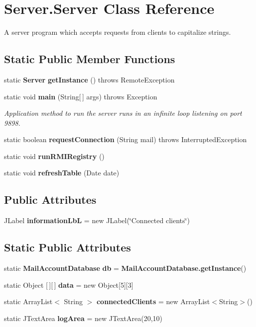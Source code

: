 \section{Server.\+Server Class Reference}
\label{class_server_1_1_server}


A server program which accepts requests from clients to capitalize strings.  


\subsection*{Static Public Member Functions}
\begin{DoxyCompactItemize}
\item 
static \textbf{ Server} \textbf{ get\+Instance} ()  throws Remote\+Exception 
\item 
static void \textbf{ main} (String[$\,$] args)  throws Exception 
\begin{DoxyCompactList}\small\item\em Application method to run the server runs in an infinite loop listening on port 9898. \end{DoxyCompactList}\item 
static boolean \textbf{ request\+Connection} (String mail)  throws Interrupted\+Exception 
\item 
static void \textbf{ run\+R\+M\+I\+Registry} ()
\item 
static void \textbf{ refresh\+Table} (Date date)
\end{DoxyCompactItemize}
\subsection*{Public Attributes}
\begin{DoxyCompactItemize}
\item 
J\+Label \textbf{ information\+LbL} = new J\+Label(\char`\"{}Connected clients\char`\"{})
\end{DoxyCompactItemize}
\subsection*{Static Public Attributes}
\begin{DoxyCompactItemize}
\item 
static \textbf{ Mail\+Account\+Database} \textbf{ db} = \textbf{ Mail\+Account\+Database.\+get\+Instance}()
\item 
static Object [$\,$][$\,$] \textbf{ data} = new Object[5][3]
\item 
static Array\+List$<$ String $>$ \textbf{ connected\+Clients} = new Array\+List$<$String$>$()
\item 
static J\+Text\+Area \textbf{ log\+Area} = new J\+Text\+Area(20,10)
\end{DoxyCompactItemize}
